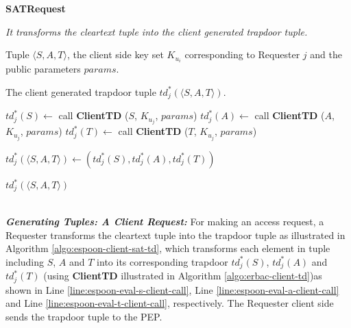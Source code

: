 \documentclass[epsfig,a4paper,11pt,titlepage]{book}
\numberwithin{algorithm}{chapter}
\newcommand{\algofontsize}{\fontsize{11}{12}\selectfont}
\begin{document}
\begin{algorithm} [htp]
{\algofontsize
\caption{\textbf{SATRequest}}

\label{algo:espoon-client-sat-td}

\begin{algorithmic}[1]

\INPUT \emph{It transforms the cleartext tuple into the client generated trapdoor tuple.}

\Require Tuple $\langle S, A, T \rangle$, the client side key set $K_{u_i}$ corresponding to Requester $j$ and the public parameters $params$.

\Ensure The client generated trapdoor tuple $td^*_j (\langle S, A, T \rangle)$.

\medskip

\State $td^*_j (S) \leftarrow$ call \textbf{ClientTD} ($S$, $K_{u_j}$, $params$) \label{line:espoon-eval-s-client-call}
\State $td^*_j (A) \leftarrow$ call \textbf{ClientTD} ($A$, $K_{u_j}$, $params$) \label{line:espoon-eval-a-client-call}
\State $td^*_j (T) \leftarrow$ call \textbf{ClientTD} ($T$, $K_{u_j}$, $params$) \label{line:espoon-eval-t-client-call}

\State $td^*_j (\langle S, A, T \rangle) \leftarrow (td^*_j (S), td^*_j (A), td^*_j (T))$ \label{line:espoon-eval-sat-client-assignment}

\Return $td^*_j (\langle S, A, T \rangle)$

\end{algorithmic}
}
\end{algorithm}
\noindent \\
\noindent \emph{\textbf{Generating Tuples: A Client Request:}}
For making an access request, a Requester transforms the cleartext tuple into the trapdoor tuple as illustrated in Algorithm \ref{algo:espoon-client-sat-td}, which transforms each element in tuple including $S$, $A$ and $T$ into its corresponding trapdoor $td^*_j (S)$, $td^*_j (A)$ and $td^*_j (T)$ (using \textbf{ClientTD} illustrated in Algorithm \ref{algo:erbac-client-td})as shown in Line \ref{line:espoon-eval-s-client-call}, Line \ref{line:espoon-eval-a-client-call} and Line \ref{line:espoon-eval-t-client-call}, respectively. The Requester client side sends the trapdoor tuple to the \gls{PEP}.
\end{document}

